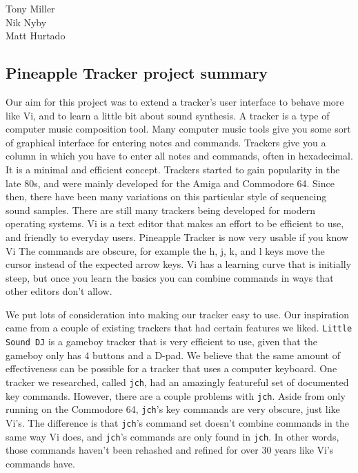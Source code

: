 \documentclass[12pt,letterpaper]{article}
\begin{document}
\begin{flushright}
Tony Miller\\
Nik Nyby\\
Matt Hurtado
\end{flushright}

\begin{center}
\section*{Pineapple Tracker project summary}
\end{center}


\doublespacing

\par
Our aim for this project was to extend a tracker's user interface to behave more like Vi, and to learn a little bit about sound synthesis.
A tracker is a type of computer music composition tool.
Many computer music tools give you some sort of graphical interface for entering notes and commands.
Trackers give you a column in which you have to enter all notes and commands, often in hexadecimal.
It is a minimal and efficient concept.
Trackers started to gain popularity in the late 80s, and were mainly developed for the Amiga and Commodore 64.
Since then, there have been many variations on this particular style of sequencing sound samples.
There are still many trackers being developed for modern operating systems.
Vi is a text editor that makes an effort to be efficient to use, and friendly to everyday users.
Pineapple Tracker is now very usable if you know Vi
The commands are obscure, for example the h, j, k, and l keys move the cursor instead of the expected arrow keys.
Vi has a learning curve that is initially steep, but once you learn the basics you can combine commands in ways that other editors don't allow.

\par
We put lots of consideration into making our tracker easy to use.
Our inspiration came from a couple of existing trackers that had certain features we liked.
{\tt Little Sound DJ} is a gameboy tracker that is very efficient to use, given that the gameboy only has 4 buttons and a D-pad.
We believe that the same amount of effectiveness can be possible for a tracker that uses a computer keyboard.
One tracker we researched, called {\tt jch}, had an amazingly featureful set of documented key commands.
However, there are a couple problems with {\tt jch}.
Aside from only running on the Commodore 64, {\tt jch}'s key commands are very obscure, just like Vi's.
The difference is that {\tt jch}'s command set doesn't combine commands in the same way Vi does, and {\tt jch}'s commands are only found in {\tt jch}.
In other words, those commands haven't been rehashed and refined for over 30 years like Vi's commands have.
\end{document}
